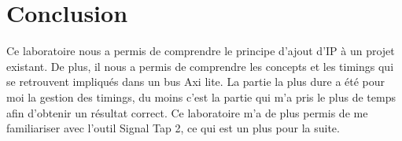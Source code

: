\section{Conclusion}

Ce laboratoire nous a permis de comprendre le principe d'ajout d'IP à un projet existant. De plus, il nous a permis de comprendre les concepts et les timings qui se retrouvent impliqués dans un bus Axi lite. La partie la plus dure a été pour moi la gestion des timings, du moins c'est la partie qui m'a pris le plus de temps afin d'obtenir un résultat correct. Ce laboratoire m'a de plus permis de me familiariser avec l'outil Signal Tap 2, ce qui est un plus pour la suite.